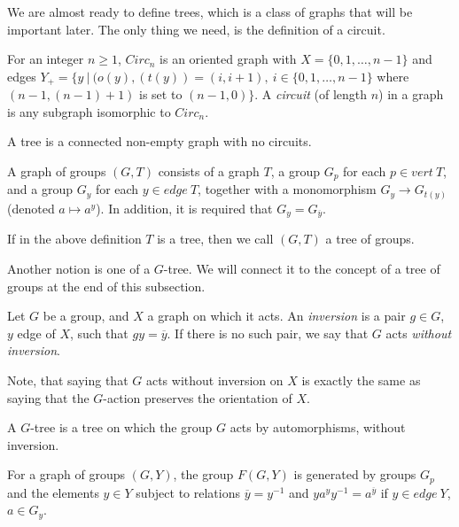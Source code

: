 
We are almost ready to define trees, which is a class of graphs that will be important later. The only thing we need, is the definition of a circuit.

\begin{definition}
    For an integer $n \ge 1$, $Circ_n$ is an oriented graph with $X = \{0,1, \ldots , n-1 \}$ and edges $Y_+ = \{ y \:| \: (o(y),(t(y)) = (i,i+1), \: i\in \{0,1,\ldots,n-1\} $ where $(n-1, (n-1) + 1)$ is set to $(n-1,0)\}$. A \emph{circuit} (of length $n$) in a graph is any subgraph isomorphic to $Circ_n$.
\end{definition}

\begin{definition} 
    A tree is a connected non-empty graph with no circuits.
\end{definition}

\begin{definition}\label{grpgraph}
    A graph of groups $(G,T)$ consists of a graph $T$, a group $G_p$ for each $p \in vert\:T$, and a group $G_y$ for each $y \in edge\: T$, together with a monomorphism $G_y \to G_{t(y)}$ (denoted $a \mapsto a^y$). In addition, it is required that $G_y = G_{\overline{y}}$.
\end{definition}

If in the above definition $T$ is a tree, then we call $(G,T)$ a tree of groups.

Another notion is one of a $G$-tree. We will connect it to the concept of a tree of groups at the end of this subsection.

\begin{definition}
    Let $G$ be a group, and $X$ a graph on which it acts. An \emph{inversion} is a pair $g \in G$, $y$ edge of $X$, such that $gy = \overline{y}$. If there is no such pair, we say that $G$ acts \emph{without inversion}. 
\end{definition}

Note, that saying that $G$ acts without inversion on $X$ is exactly the same as saying that the $G$-action preserves the orientation of $X$.

\begin{definition}
    A $G$-tree is a tree on which the group $G$ acts by automorphisms, without inversion.
\end{definition}

\begin{definition}
    For a graph of groups $(G,Y)$, the group $F(G,Y)$ is generated by groups $G_p$ and the elements $y \in Y$ subject to relations $\overline{y} = y^{-1}$ and $ya^yy^{-1} = a^{\overline{y}}$ if $y \in edge \: Y$, $a \in G_y$.
\end{definition}

